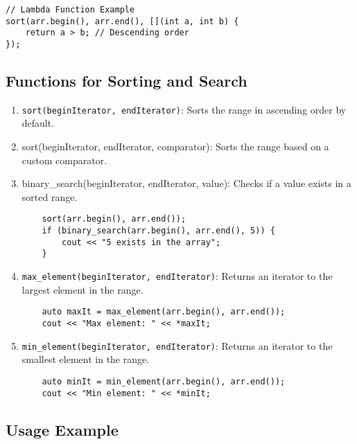 \documentclass{article}
\begin{document}
\begin{lstlisting}
// Lambda Function Example
sort(arr.begin(), arr.end(), [](int a, int b) {
    return a > b; // Descending order
});
\end{lstlisting}

\subsection{Functions for Sorting and Search}

\begin{enumerate}
    \item \texttt{sort(beginIterator, endIterator)}: Sorts the range in ascending order by default.
    \item sort(beginIterator, endIterator, comparator): Sorts the range based on a custom comparator.
    \item binary\_search(beginIterator, endIterator, value): Checks if a value exists in a sorted range.
    \begin{lstlisting}
    sort(arr.begin(), arr.end());
    if (binary_search(arr.begin(), arr.end(), 5)) {
        cout << "5 exists in the array";
    }
    \end{lstlisting}
    \item \texttt{max\_element(beginIterator, endIterator)}: Returns an iterator to the largest element in the range.
    \begin{lstlisting}
    auto maxIt = max_element(arr.begin(), arr.end());
    cout << "Max element: " << *maxIt;
    \end{lstlisting}
    \item \texttt{min\_element(beginIterator, endIterator)}: Returns an iterator to the smallest element in the range.
    \begin{lstlisting}
    auto minIt = min_element(arr.begin(), arr.end());
    cout << "Min element: " << *minIt;
    \end{lstlisting}
\end{enumerate}

\subsection{Usage Example}
\end{document}
